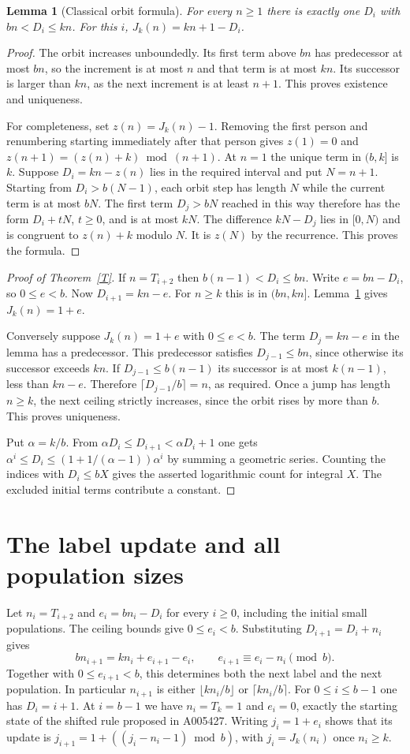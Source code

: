 \documentclass[11pt]{article}
\newtheorem{lemma}[theorem]{Lemma}
\begin{document}
\begin{lemma}[Classical orbit formula]\label{orbit}
For every $n\ge1$ there is exactly one $D_i$ with $bn<D_i\le kn$. For this $i$, $J_k(n)=kn+1-D_i$.
\end{lemma}
\begin{proof}
The orbit increases unboundedly. Its first term above $bn$ has predecessor at most $bn$, so the increment is at most $n$ and that term is at most $kn$. Its successor is larger than $kn$, as the next increment is at least $n+1$. This proves existence and uniqueness.

For completeness, set $z(n)=J_k(n)-1$. Removing the first person and renumbering starting immediately after that person gives $z(1)=0$ and $z(n+1)=(z(n)+k)\bmod(n+1)$. At $n=1$ the unique term in $(b,k]$ is $k$. Suppose $D_i=kn-z(n)$ lies in the required interval and put $N=n+1$. Starting from $D_i>b(N-1)$, each orbit step has length $N$ while the current term is at most $bN$. The first term $D_j>bN$ reached in this way therefore has the form $D_i+tN$, $t\ge0$, and is at most $kN$. The difference $kN-D_j$ lies in $[0,N)$ and is congruent to $z(n)+k$ modulo $N$. It is $z(N)$ by the recurrence. This proves the formula.
\end{proof}
\begin{proof}[Proof of Theorem~\ref{T}]
If $n=T_{i+2}$ then $b(n-1)<D_i\le bn$. Write $e=bn-D_i$, so $0\le e<b$. Now $D_{i+1}=kn-e$. For $n\ge k$ this is in $(bn,kn]$. Lemma~\ref{orbit} gives $J_k(n)=1+e$.

Conversely suppose $J_k(n)=1+e$ with $0\le e<b$. The term $D_j=kn-e$ in the lemma has a predecessor. This predecessor satisfies $D_{j-1}\le bn$, since otherwise its successor exceeds $kn$. If $D_{j-1}\le b(n-1)$ its successor is at most $k(n-1)$, less than $kn-e$. Therefore $\lceil D_{j-1}/b\rceil=n$, as required. Once a jump has length $n\ge k$, the next ceiling strictly increases, since the orbit rises by more than $b$. This proves uniqueness.

Put $\alpha=k/b$. From $\alpha D_i\le D_{i+1}<\alpha D_i+1$ one gets $\alpha^i\le D_i\le(1+1/(\alpha-1))\alpha^i$ by summing a geometric series. Counting the indices with $D_i\le bX$ gives the asserted logarithmic count for integral $X$. The excluded initial terms contribute a constant.
\end{proof}

\clearpage
\section{The label update and all population sizes}
Let $n_i=T_{i+2}$ and $e_i=bn_i-D_i$ for every $i\ge0$, including the initial small populations. The ceiling bounds give $0\le e_i<b$. Substituting $D_{i+1}=D_i+n_i$ gives
\[
 b n_{i+1}=k n_i+e_{i+1}-e_i,\qquad
 e_{i+1}\equiv e_i-n_i\pmod b.
\]
Together with $0\le e_{i+1}<b$, this determines both the next label and the next population. In particular $n_{i+1}$ is either $\lfloor k n_i/b\rfloor$ or $\lceil k n_i/b\rceil$. For $0\le i\le b-1$ one has $D_i=i+1$. At $i=b-1$ we have $n_i=T_k=1$ and $e_i=0$, exactly the starting state of the shifted rule proposed in A005427. Writing $j_i=1+e_i$ shows that its update is $j_{i+1}=1+((j_i-n_i-1)\bmod b)$, with $j_i=J_k(n_i)$ once $n_i\ge k$.
\end{document}
